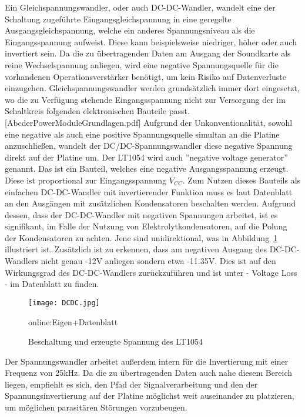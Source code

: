 Ein Gleichspannungswandler, oder auch DC-DC-Wandler, wandelt eine der Schaltung zugeführte Eingangsgleichspannung in eine geregelte Ausgangsgleichspannung, welche ein anderes Spannungsniveau als die Eingangsspannung aufweist. Diese kann beispielsweise niedriger, höher oder auch invertiert sein.
Da die zu übertragenden Daten am Ausgang der Soundkarte als reine Wechselspannung anliegen, wird eine negative Spannungsquelle für die vorhandenen Operationsverstärker benötigt, um kein Risiko auf Datenverluste einzugehen.
Gleichspannungswandler werden grundsätzlich immer dort eingesetzt, wo die zu Verfügung stehende Eingangsspannung nicht zur Versorgung der im Schaltkreis folgenden elektronischen Bauteile passt.[AbcderPowerModuleGrundlagen.pdf] Aufgrund der Unkonventionalität, sowohl eine negative als auch eine positive Spannungsquelle simultan an die Platine anzuschließen, wandelt der DC/DC-Spannungswandler diese negative Spannung direkt auf der Platine um. Der LT1054 wird auch ”negative voltage generator” genannt. Das ist ein Bauteil, welches eine negative Ausgangsspannung erzeugt. Diese ist proportional zur Eingangsspannung $V_{CC}$. Zum Nutzen dieses Bauteils als einfachen DC-DC-Wandler mit invertierender Funktion muss es laut Datenblatt an den Ausgängen mit zusätzlichen Kondensatoren beschalten werden. Aufgrund dessen, dass der DC-DC-Wandler mit negativen Spannungen arbeitet, ist es signifikant, im Falle der Nutzung von Elektrolytkondensatoren, auf die Polung der Kondensatoren zu achten. Jene sind unidirektional, was in Abbildung~\ref{fig:DCDC} illustriert ist. Zusätzlich ist zu erkennen, dass am negativen Ausgang des DC-DC-Wandlers nicht genau -12V anliegen sondern etwa -11.35V. Dies ist auf den Wirkungsgrad des DC-DC-Wandlers zurückzuführen und ist unter - Voltage Loss - im Datenblatt zu finden. 

\begin{figure}[H]
	\centering
	\texttt{[image: DCDC.jpg]}
	\caption[Beschaltung und erzeugte Spannung des LT1054]{Beschaltung und erzeugte Spannung des LT1054} 
	\gls{online:Eigen}+Datenblatt
	\label{fig:DCDC}
\end{figure}

Der Spannungswandler arbeitet außerdem intern für die Invertierung mit einer Frequenz von 25kHz. Da die zu übertragenden Daten auch nahe diesem Bereich liegen, empfiehlt es sich, den Pfad der Signalverarbeitung und den der Spannungsinvertierung auf der Platine möglichst weit auseinander zu platzieren, um möglichen parasitären Störungen vorzubeugen.


